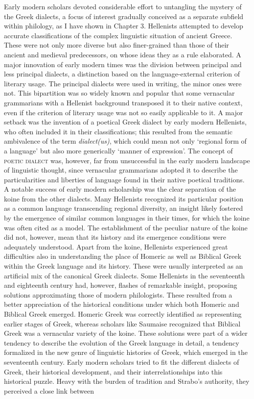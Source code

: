 \begin{styleStandard}
Early modern scholars devoted considerable effort to untangling the mystery of the Greek dialects, a focus of interest gradually conceived as a separate subfield within philology, as I have shown in Chapter 3. Hellenists attempted to develop accurate classifications of the complex linguistic situation of ancient Greece. These were not only more diverse but also finer-grained than those of their ancient and medieval predecessors, on whose ideas they as a rule elaborated. A major innovation of early modern times was the division between principal and less principal dialects, a distinction based on the language-external criterion of literary usage. The principal dialects were used in writing, the minor ones were not. This bipartition was so widely known and popular that some vernacular grammarians with a Hellenist background transposed it to their native context, even if the criterion of literary usage was not so easily applicable to it. A major setback was the invention of a poetical Greek dialect by early modern Hellenists, who often included it in their classifications; this resulted from the semantic ambivalence of the term \textit{dialect(us)}, which could mean not only ‘regional form of a language’ but also more generically ‘manner of expression’. The concept of \textsc{poetic dialect} was, however, far from unsuccessful in the early modern landscape of linguistic thought, since vernacular grammarians adopted it to describe the particularities and liberties of language found in their native poetical traditions. A notable success of early modern scholarship was the clear separation of the koine from the other dialects. Many Hellenists recognized its particular position as a common language transcending regional diversity, an insight likely fostered by the emergence of similar common languages in their times, for which the koine was often cited as a model. The establishment of the peculiar nature of the koine did not, however, mean that its history and its emergence conditions were adequately understood. Apart from the koine, Hellenists experienced great difficulties also in understanding the place of Homeric as well as Biblical Greek within the Greek language and its history. These were usually interpreted as an artificial mix of the canonical Greek dialects. Some Hellenists in the seventeenth and eighteenth century had, however, flashes of remarkable insight, proposing solutions approximating those of modern philologists. These resulted from a better appreciation of the historical conditions under which both Homeric and Biblical Greek emerged. Homeric Greek was correctly identified as representing earlier stages of Greek, whereas scholars like Saumaise recognized that Biblical Greek was a vernacular variety of the koine. These solutions were part of a wider tendency to describe the evolution of the Greek language in detail, a tendency formalized in the new genre of linguistic histories of Greek, which emerged in the seventeenth century. Early modern scholars tried to fit the different dialects of Greek, their historical development, and their interrelationships into this historical puzzle. Heavy with the burden of tradition and Strabo’s authority, they perceived a close link between 
\end{styleStandard}
